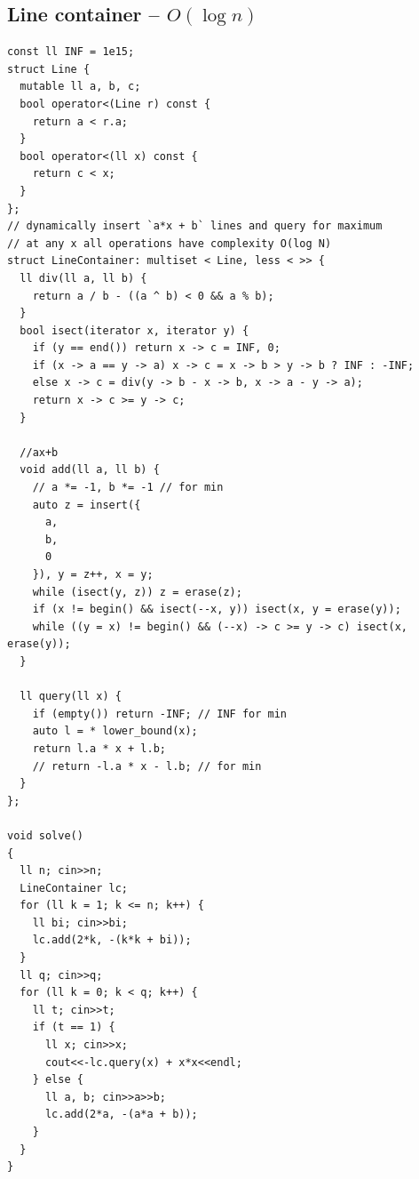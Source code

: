 \documentclass[10pt,a4paper,twocolumn]{article}
\begin{document}
    \subsection{Line container -- $O(\log n)$}
    
	\begin{lstlisting}[style=cpp, title={line$\_$container.cpp}]
const ll INF = 1e15;
struct Line {
  mutable ll a, b, c;
  bool operator<(Line r) const {
    return a < r.a;
  }
  bool operator<(ll x) const {
    return c < x;
  }
};
// dynamically insert `a*x + b` lines and query for maximum
// at any x all operations have complexity O(log N)
struct LineContainer: multiset < Line, less < >> {
  ll div(ll a, ll b) {
    return a / b - ((a ^ b) < 0 && a % b);
  }
  bool isect(iterator x, iterator y) {
    if (y == end()) return x -> c = INF, 0;
    if (x -> a == y -> a) x -> c = x -> b > y -> b ? INF : -INF;
    else x -> c = div(y -> b - x -> b, x -> a - y -> a);
    return x -> c >= y -> c;
  }

  //ax+b
  void add(ll a, ll b) {
    // a *= -1, b *= -1 // for min
    auto z = insert({
      a,
      b,
      0
    }), y = z++, x = y;
    while (isect(y, z)) z = erase(z);
    if (x != begin() && isect(--x, y)) isect(x, y = erase(y));
    while ((y = x) != begin() && (--x) -> c >= y -> c) isect(x, erase(y));
  }

  ll query(ll x) {
    if (empty()) return -INF; // INF for min
    auto l = * lower_bound(x);
    return l.a * x + l.b;
    // return -l.a * x - l.b; // for min
  }
};

void solve()
{
  ll n; cin>>n;
  LineContainer lc;
  for (ll k = 1; k <= n; k++) {
    ll bi; cin>>bi;
    lc.add(2*k, -(k*k + bi));
  }
  ll q; cin>>q;
  for (ll k = 0; k < q; k++) {
    ll t; cin>>t;
    if (t == 1) {
      ll x; cin>>x;
      cout<<-lc.query(x) + x*x<<endl;
    } else {
      ll a, b; cin>>a>>b;
      lc.add(2*a, -(a*a + b));
    }
  }
}
    \end{lstlisting}
    
\end{document}
